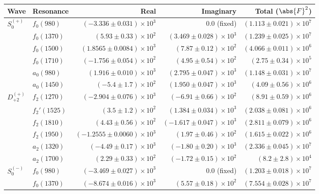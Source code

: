 \begin{table}[ht]
    \begin{center}
        \begin{tabular}{llrrr}\toprule
        Wave & Resonance & Real & Imaginary & Total ($\abs{F}^2$) \\\midrule
$S_{0}^{(+)}$ & $f_{0}(980)$ & $(-3.336 \pm 0.031) \times 10^{3}$ & $0.0$ (fixed) & $(1.113 \pm 0.021) \times 10^{7}$ \\
 & $f_{0}(1370)$ & $(5.93 \pm 0.33) \times 10^{2}$ & $(3.469 \pm 0.028) \times 10^{3}$ & $(1.239 \pm 0.025) \times 10^{7}$ \\
 & $f_{0}(1500)$ & $(1.8565 \pm 0.0084) \times 10^{3}$ & $(7.87 \pm 0.12) \times 10^{2}$ & $(4.066 \pm 0.011) \times 10^{6}$ \\
 & $f_{0}(1710)$ & $(-1.756 \pm 0.054) \times 10^{2}$ & $(4.95 \pm 0.54) \times 10^{2}$ & $(2.75 \pm 0.34) \times 10^{5}$ \\
 & $a_{0}(980)$ & $(1.916 \pm 0.010) \times 10^{3}$ & $(2.795 \pm 0.047) \times 10^{3}$ & $(1.148 \pm 0.031) \times 10^{7}$ \\
 & $a_{0}(1450)$ & $(-5.4 \pm 1.7) \times 10^{2}$ & $(1.950 \pm 0.047) \times 10^{3}$ & $(4.09 \pm 0.56) \times 10^{6}$ \\
$D_{+2}^{(+)}$ & $f_{2}(1270)$ & $(-2.904 \pm 0.076) \times 10^{3}$ & $(-6.91 \pm 0.66) \times 10^{2}$ & $(8.91 \pm 0.59) \times 10^{6}$ \\
 & $f_{2}'(1525)$ & $(3.5 \pm 1.2) \times 10^{2}$ & $(1.384 \pm 0.034) \times 10^{3}$ & $(2.038 \pm 0.081) \times 10^{6}$ \\
 & $f_{2}(1810)$ & $(4.43 \pm 0.56) \times 10^{2}$ & $(-1.617 \pm 0.047) \times 10^{3}$ & $(2.811 \pm 0.079) \times 10^{6}$ \\
 & $f_{2}(1950)$ & $(-1.2555 \pm 0.0060) \times 10^{3}$ & $(1.97 \pm 0.46) \times 10^{2}$ & $(1.615 \pm 0.022) \times 10^{6}$ \\
 & $a_{2}(1320)$ & $(-4.49 \pm 0.17) \times 10^{3}$ & $(-1.80 \pm 0.20) \times 10^{3}$ & $(2.336 \pm 0.045) \times 10^{7}$ \\
 & $a_{2}(1700)$ & $(2.29 \pm 0.33) \times 10^{2}$ & $(-1.72 \pm 0.15) \times 10^{2}$ & $(8.2 \pm 2.8) \times 10^{4}$ \\
$S_{0}^{(-)}$ & $f_{0}(980)$ & $(-3.469 \pm 0.027) \times 10^{3}$ & $0.0$ (fixed) & $(1.203 \pm 0.018) \times 10^{7}$ \\
 & $f_{0}(1370)$ & $(-8.674 \pm 0.016) \times 10^{3}$ & $(5.57 \pm 0.18) \times 10^{2}$ & $(7.554 \pm 0.028) \times 10^{7}$ \\

\end{tabular}
\end{center}
\end{table}
